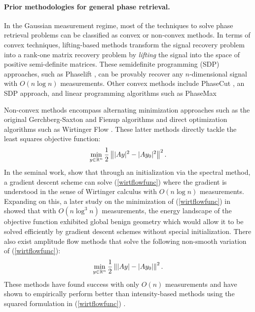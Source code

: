 \documentclass{article}
\begin{document}

\paragraph{Prior methodologies for general phase retrieval.} In the Gaussian measurement regime, most of the techniques to solve phase retrieval problems can be classified as convex or non-convex methods. In terms of convex techniques, lifting-based methods transform the signal recovery problem into a rank-one matrix recovery problem by \textit{lifting} the signal into the space of positive semi-definite matrices. These semidefinite programming (SDP) approaches, such as Phaselift \cite{CandStroh2013}, can be provably recover any $n$-dimensional signal with $O(n \log n)$ measurements. Other convex methods include PhaseCut \cite{Phasecut}, an SDP approach, and linear programming algorithms such as PhaseMax \cite{Phasemax}

Non-convex methods encompass alternating minimization approaches such as the original Gerchberg-Saxton \cite{GerchSaxAlg} and Fienup \cite{FienupAlg} algorithms and direct optimization algorithms such as Wirtinger Flow \cite{Candes2015}. These latter methods directly tackle the least squares objective function: \begin{align}
\min_{y \in \mathbb{R}^n} \frac{1}{2} \left\| |Ay|^2 - |Ay_0|^2 \right\|^2. \label{wirtflowfunc}
\end{align} In the seminal work, \cite{Candes2015} show that through an initialization via the spectral method, a gradient descent scheme can solve (\ref{wirtflowfunc}) where the gradient is understood in the sense of Wirtinger calculus with $O(n \log n)$ measurements. Expanding on this, a later study on the minimization of (\ref{wirtflowfunc}) in \cite{Wright2016} showed that with $O(n \log^3 n)$ measurements, the energy landscape of the objective function exhibited global benign geometry which would allow it to be solved efficiently by gradient descent schemes without special initialization. There also exist amplitude flow methods that solve the following non-smooth variation of (\ref{wirtflowfunc}):
\begin{align}
\min_{y \in \mathbb{R}^n} \frac{1}{2} \left\| |Ay| - |Ay_0| \right\|^2. \label{ampflowfunc}
\end{align} These methods have found success with only $O(n)$ measurements \cite{Wang2017} and have shown to empirically perform better than intensity-based methods using the squared formulation in (\ref{wirtflowfunc}) \cite{Yeh2015}.
\end{document}
